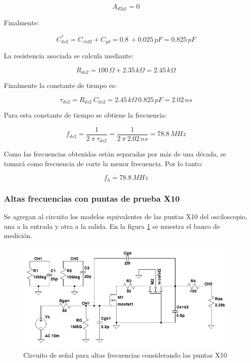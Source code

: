 \documentclass[10pt,spanish,a4paper,notitlepage]{article}
\begin{document}
\begin{itemize}
\[ \displaystyle A_{d2g1} = 0 \]

Finalmente:

\[ \displaystyle C_{ds2}^* = C_{s1d2} + C_{gd} = 0.8\,\unit{} + 0.025\,\unit{pF}
= 0.825\,\unit{pF}\]

La resistencia asociada se calcula mediante:

\[ \displaystyle R_{ds2} = 100\,\unit{\Omega} + 2.35\,\unit{k\Omega} = 2.45\,\unit{k\Omega} \]

Finalmente la constante de tiempo es:

\[ \displaystyle \tau_{ds2} = R_{ds2}\ C_{ds2} =  2.45\,\unit{k\Omega}\ 0.825\,\unit{pF} =
2.02\,\unit{ns}\]

Para esta constante de tiempo se obtiene la frecuencia:

\[ \displaystyle f_{ds2} = \frac{1}{2\ \pi \ \tau_{ds2}} =
\frac{1}{2\ \pi \ 2.02\,\unit{ns}} = 78.8\,\unit{MHz} \]

\end{itemize}

Como las frecuencias obtenidas están separadas por más de una década,
se tomará como frecuencia de corte la menor frecuencia. Por lo tanto:

\[ \displaystyle f_{h} = 78.8\,\unit{MHz} \]


\subsubsection{Altas frecuencias con puntas de prueba X10}

Se agregan al circuito los modelos equivalentes de las 
puntas X10 del osciloscopio, una a la entrada y otra a la salida. 
En la figura \ref{fig:altas_frec_puntaX10} se muestra el banco
de medición.


\begin{figure}[H]
\centering
\includegraphics[scale=0.65]{circuitos/circuito_altas_frecuencias_puntaX10.png}
\caption{Circuito de señal para altas frecuencias considerando las puntas X10}
\label{fig:altas_frec_puntaX10}
\end{figure}
\end{document}
